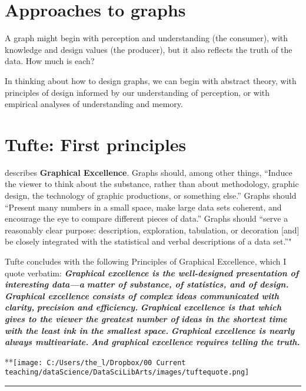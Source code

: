 \documentclass[]{book}
\theoremstyle{definition}
\theoremstyle{definition}
\theoremstyle{definition}
\theoremstyle{remark}
\begin{document}
\section{Approaches to graphs}\label{approaches-to-graphs}

A graph might begin with perception and understanding (the consumer),
with knowledge and design values (the producer), but it also reflects
the truth of the data. How much is each?

In thinking about how to design graphs, we can begin with abstract
theory, with principles of design informed by our understanding of
perception, or with empirical analyses of understanding and memory.

\section{Tufte: First principles}\label{tufte-first-principles}

\citet{tufte2001visual} describes \textbf{Graphical Excellence}. Graphs
should, among other things, ``Induce the viewer to think about the
substance, rather than about methodology, graphic design, the technology
of graphic productions, or something else.'' Graphs should ``Present
many numbers in a small space, make large data sets coherent, and
encourage the eye to compare different pieces of data.'' Graphs should
``serve a reasonably clear purpose: description, exploration,
tabulation, or decoration {[}and{]} be closely integrated with the
statistical and verbal descriptions of a data set.''"

Tufte concludes with the following Principles of Graphical Excellence,
which I quote verbatim: \textbf{\emph{Graphical excellence is the
well-designed presentation of interesting data---a}}
\textbf{\emph{matter of substance, of statistics, and of design.}}
\textbf{\emph{Graphical excellence consists of complex ideas
communicated with clarity,}} \textbf{\emph{precision and efficiency.}}
\textbf{\emph{Graphical excellence is that which gives to the viewer the
greatest number of}} \textbf{\emph{ideas in the shortest time with the
least ink in the smallest space.}} \textbf{\emph{Graphical excellence is
nearly always multivariate.}} \textbf{\emph{And graphical excellence
requires telling the truth.}}

**\texttt{[image: C:/Users/the\_l/Dropbox/00 Current teaching/dataScience/DataSciLibArts/images/tuftequote.png]}

\begin{center}\rule{0.5\linewidth}{\linethickness}\end{center}
\end{document}
